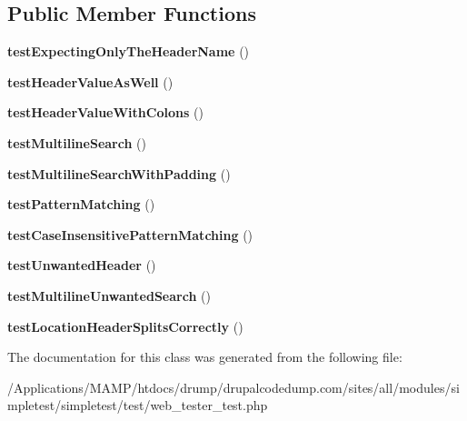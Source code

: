 \subsection*{Public Member Functions}
\begin{DoxyCompactItemize}
\item 
\hypertarget{class_test_of_header_expectations_aaefb0bf0c4eb5f1c46d2f36f0b97ebe8}{
{\bfseries testExpectingOnlyTheHeaderName} ()}
\label{class_test_of_header_expectations_aaefb0bf0c4eb5f1c46d2f36f0b97ebe8}

\item 
\hypertarget{class_test_of_header_expectations_aec0a7aefd80e697dc9936f9733c12ee8}{
{\bfseries testHeaderValueAsWell} ()}
\label{class_test_of_header_expectations_aec0a7aefd80e697dc9936f9733c12ee8}

\item 
\hypertarget{class_test_of_header_expectations_a67b0c3125cc1a5aa79530ebe9a373653}{
{\bfseries testHeaderValueWithColons} ()}
\label{class_test_of_header_expectations_a67b0c3125cc1a5aa79530ebe9a373653}

\item 
\hypertarget{class_test_of_header_expectations_a18358859c94291006a6dc86c18e5cf26}{
{\bfseries testMultilineSearch} ()}
\label{class_test_of_header_expectations_a18358859c94291006a6dc86c18e5cf26}

\item 
\hypertarget{class_test_of_header_expectations_a8f1622d4343722de20c18f307846fd96}{
{\bfseries testMultilineSearchWithPadding} ()}
\label{class_test_of_header_expectations_a8f1622d4343722de20c18f307846fd96}

\item 
\hypertarget{class_test_of_header_expectations_ade6469e9e3fc0adea7f76eba934d0c7c}{
{\bfseries testPatternMatching} ()}
\label{class_test_of_header_expectations_ade6469e9e3fc0adea7f76eba934d0c7c}

\item 
\hypertarget{class_test_of_header_expectations_a19f251092f295eee2b9e210bca6efcdc}{
{\bfseries testCaseInsensitivePatternMatching} ()}
\label{class_test_of_header_expectations_a19f251092f295eee2b9e210bca6efcdc}

\item 
\hypertarget{class_test_of_header_expectations_a21fe9b17f27ce5d26c04ca27697ecf2f}{
{\bfseries testUnwantedHeader} ()}
\label{class_test_of_header_expectations_a21fe9b17f27ce5d26c04ca27697ecf2f}

\item 
\hypertarget{class_test_of_header_expectations_a65d0e525559156abc83c531220679d4a}{
{\bfseries testMultilineUnwantedSearch} ()}
\label{class_test_of_header_expectations_a65d0e525559156abc83c531220679d4a}

\item 
\hypertarget{class_test_of_header_expectations_a0ee9c139b731255b3e3e9997fa80c351}{
{\bfseries testLocationHeaderSplitsCorrectly} ()}
\label{class_test_of_header_expectations_a0ee9c139b731255b3e3e9997fa80c351}

\end{DoxyCompactItemize}


The documentation for this class was generated from the following file:\begin{DoxyCompactItemize}
\item 
/Applications/MAMP/htdocs/drump/drupalcodedump.com/sites/all/modules/simpletest/simpletest/test/web\_\-tester\_\-test.php\end{DoxyCompactItemize}
